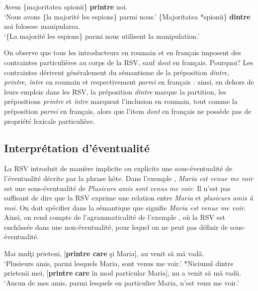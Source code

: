 \ea \label{ch3:ex74} 
\ea 
Avem \{majoritatea {\textbar} spionii\} \textbf{printre} noi. \label{ch3:ex74a}\\
\glt ‘Nous avons \{la majorité {\textbar} les espions\} parmi nous.’
\ex 
\{Majoritatea {\textbar} *spionii\} \textbf{dintre} noi folosesc manipularea. \label{ch3:ex74b}\\
\glt ‘\{La majorité {\textbar} les espions\} parmi nous utilisent la manipulation.’
\z 
\z

On observe que tous les introducteurs en roumain et en français imposent des contraintes particulières au corps de la RSV, sauf \textit{dont} en français. Pourquoi? Les contraintes dérivent généralement du sémantisme de la préposition \textit{dintre, printre, între} en roumain et respectivement \textit{parmi} en français : ainsi, en dehors de leurs emplois dans les RSV, la préposition \textit{dintre} marque la partition, les prépositions \textit{printre} et \textit{între} marquent l’inclusion en roumain, tout comme la préposition \textit{parmi} en français, alors que l’item \textit{dont} en français ne possède pas de propriété lexicale particulière.   


\subsection{Interprétation d’éventualité}\label{ch3:sect3.3.3}

La RSV introduit de manière implicite ou explicite une sous-éventualité de l’éven\-tualité décrite par la phrase hôte. Dans l’exemple , \textit{Maria est venue me voir} est une sous-éventualité de \textit{Plusieurs amis sont venus me voir}. Il n’est pas suffisant de dire que la RSV exprime une relation entre \textit{Maria} et \textit{plusieurs amis à moi}. On doit spécifier dans la sémantique que  signifie \textit{Maria est venue me voir}. Ainsi, on rend compte de l’agrammaticalité de l’exemple , où la RSV est enchâssée dans une non-éventualité, pour lequel on ne peut pas définir de sous-éventualité.

\ea \label{ch3:ex75}
\ea 
Mai mulţi prieteni, [\textbf{printre care} şi Maria], au venit să mă vadă. \label{ch3:ex75a}\\
\glt ‘Plusieurs amis, parmi lesquels Maria, sont venus me voir.’
\ex 
*Niciunul dintre prietenii mei, [\textbf{printre} \textbf{care} în mod particular Maria], nu a venit să mă vadă. \label{ch3:ex75b}\\
\glt ‘Aucun de mes amis, parmi lesquels en particulier Maria, n’est venu me voir.’ 
\z 
\z

